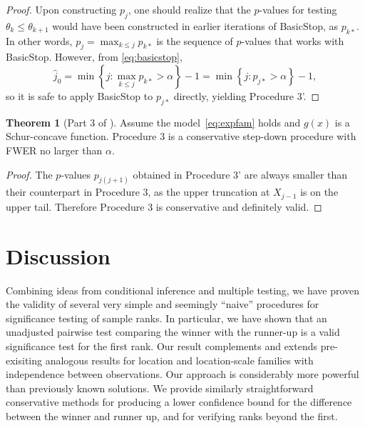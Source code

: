 \documentclass[11pt]{article}
\theoremstyle{definition}
\theoremstyle{custom}
\newtheorem*{customthm}{Theorem}
\begin{document}
\begin{proof}
Upon constructing $p_j$, one should realize that the $p$-values for testing $\theta_k \le \theta_{k+1}$ would have been constructed in earlier iterations of BasicStop, as $p_{k*}$. In other words, $p_j = \max_{k \le j} p_{k*}$ is the sequence of $p$-values that works with BasicStop. However, from \eqref{eq:basicstop},
$$\hat{j}_0 = \min\left\{j: \max_{k \le j} p_{k*} > \alpha\right\} - 1 = \min\left\{j: p_{j*} > \alpha\right\} - 1,$$
so it is safe to apply BasicStop to $p_{j*}$ directly, yielding Procedure 3'.
\end{proof}

\begin{customthm}[Part 3 of ]
Assume the model~\eqref{eq:expfam} holds and $g\left(x\right)$ is a Schur-concave function. Procedure 3 is a conservative step-down procedure with FWER no larger than $\alpha$.
\end{customthm}

\begin{proof}
The $p$-values $p_{j\left(j+1\right)}$ obtained in Procedure 3' are always smaller than their counterpart in Procedure 3, as the upper truncation at $X_{j-1}$ is on the upper tail. Therefore Procedure 3 is conservative and definitely valid.
\end{proof}

\section{Discussion}
\label{sec:disc}

Combining ideas from conditional inference and multiple testing, we have proven the validity of several very simple and seemingly ``naive'' procedures for significance testing of sample ranks. In particular, we have shown that an unadjusted pairwise test comparing the winner with the runner-up is a valid significance test for the first rank. Our result complements and extends pre-exisiting analogous results for location and location-scale families with independence between observations. Our approach is considerably more powerful than previously known solutions. We provide similarly straightforward conservative methods for producing a lower confidence bound for the difference between the winner and runner up, and for verifying ranks beyond the first.
\end{document}
